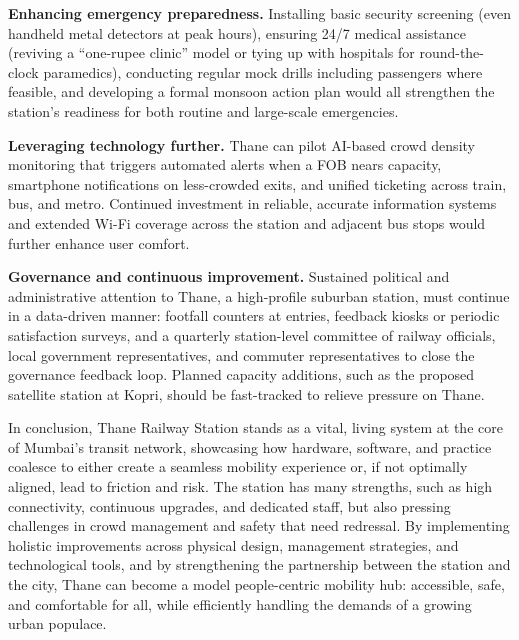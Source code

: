 \documentclass[11pt]{article}
\begin{document}
\textbf{Enhancing emergency preparedness.} Installing basic security screening (even handheld
metal detectors at peak hours), ensuring 24/7 medical assistance (reviving a ``one-rupee clinic''
model or tying up with hospitals for round-the-clock paramedics), conducting regular mock drills
including passengers where feasible, and developing a formal monsoon action plan would all
strengthen the station's readiness for both routine and large-scale emergencies.

\textbf{Leveraging technology further.} Thane can pilot AI-based crowd density monitoring that
triggers automated alerts when a FOB nears capacity, smartphone notifications on less-crowded
exits, and unified ticketing across train, bus, and metro. Continued investment in reliable,
accurate information systems and extended Wi-Fi coverage across the station and adjacent bus
stops would further enhance user comfort.

\textbf{Governance and continuous improvement.} Sustained political and administrative attention
to Thane, a high-profile suburban station, must continue in a data-driven manner: footfall
counters at entries, feedback kiosks or periodic satisfaction surveys, and a quarterly
station-level committee of railway officials, local government representatives, and commuter
representatives to close the governance feedback loop. Planned capacity additions, such as the
proposed satellite station at Kopri, should be fast-tracked to relieve pressure on Thane.

In conclusion, Thane Railway Station stands as a vital, living system at the core of Mumbai's
transit network, showcasing how hardware, software, and practice coalesce to either create a
seamless mobility experience or, if not optimally aligned, lead to friction and risk. The
station has many strengths, such as high connectivity, continuous upgrades, and dedicated staff,
but also pressing challenges in crowd management and safety that need redressal. By implementing
holistic improvements across physical design, management strategies, and technological tools,
and by strengthening the partnership between the station and the city, Thane can become a model
people-centric mobility hub: accessible, safe, and comfortable for all, while efficiently
handling the demands of a growing urban populace.
\end{document}
